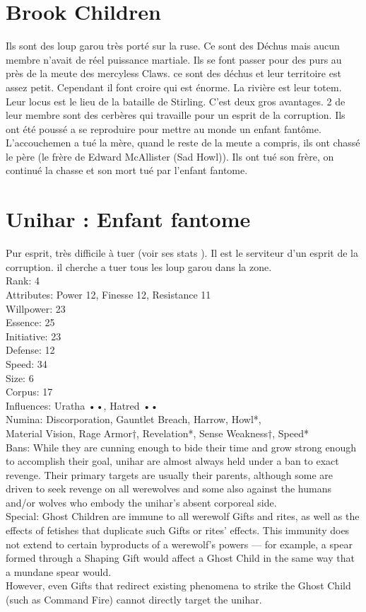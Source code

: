 \documentclass[oneside,12pt]{book}
\begin{document}
\begin{flushleft}
\section{Brook Children}
Ils sont des loup garou très porté sur la ruse. Ce sont des Déchus mais aucun membre n'avait de réel puissance martiale.
Ils se font passer pour des purs au près de la meute des mercyless Claws. ce sont des déchus et leur territoire est assez petit. Cependant il font croire qui est énorme. 
La rivière est leur totem. Leur locus est le lieu de la bataille de Stirling. C'est deux gros avantages. 
2 de leur membre sont des cerbères qui travaille pour un esprit de la corruption. Ils ont été poussé a se reproduire pour mettre au monde un enfant fantôme.
L'accouchemen a tué la mère, quand le reste de la meute a compris, ils ont chassé le père (le frère de Edward McAllister (Sad Howl)). Ils ont tué son frère, on continué la chasse et son mort tué par l'enfant fantome. 


\section{Unihar : Enfant fantome}
Pur esprit, très difficile à tuer (voir ses stats ). Il est le serviteur d'un esprit de la corruption. il cherche a tuer tous les loup garou dans la zone.\\

Rank: 4\\
Attributes: Power 12, Finesse 12, Resistance 11\\
Willpower: 23\\
Essence: 25\\
Initiative: 23\\
Defense: 12\\
Speed: 34\\
Size: 6\\
Corpus: 17\\
Influences: Uratha ••, Hatred ••\\
Numina: Discorporation, Gauntlet Breach, Harrow, Howl*,\\
Material Vision, Rage Armor†, Revelation*, Sense Weakness†,
Speed*\\
Bans: While they are cunning enough to bide their time
and grow strong enough to accomplish their goal, unihar
are almost always held under a ban to exact revenge. Their
primary targets are usually their parents, although some
are driven to seek revenge on all werewolves and some
also against the humans and/or wolves who embody the
unihar’s absent corporeal side.\\
Special: Ghost Children are immune to all werewolf Gifts
and rites, as well as the effects of fetishes that duplicate
such Gifts or rites’ effects. This immunity does not extend
to certain byproducts of a werewolf’s powers — for example,
a spear formed through a Shaping Gift would affect a
Ghost Child in the same way that a mundane spear would.\\
However, even Gifts that redirect existing phenomena
to strike the Ghost Child (such as Command Fire) cannot
directly target the unihar.\\


\end{flushleft}
\end{document}
